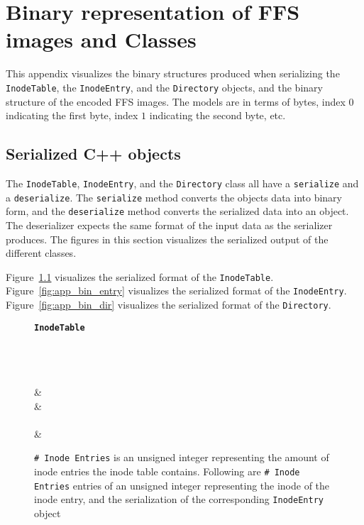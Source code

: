 \renewcommand{\chaptermark}[1]{\markboth{Appendix \thechapter\relax:\thinspace\relax#1}{}}
\chapter{Binary representation of FFS images and Classes}
\label{app:binary_rep}
This appendix visualizes the binary structures produced when serializing the \texttt{InodeTable}, the \texttt{InodeEntry}, and the \texttt{Directory} objects, and the binary structure of the encoded FFS images. The models are in terms of bytes, index $0$ indicating the first byte, index $1$ indicating the second byte, etc.

\section{Serialized C++ objects}
The \texttt{InodeTable}, \texttt{InodeEntry}, and the \texttt{Directory} class all have a \texttt{serialize} and a \texttt{deserialize}. The \texttt{serialize} method converts the objects data into binary form, and the \texttt{deserialize} method converts the serialized data into an object. The deserializer expects the same format of the input data as the serializer produces. The figures in this section visualizes the serialized output of the different classes. 

Figure~\ref{fig:app_bin_table} visualizes the serialized format of the \texttt{InodeTable}. Figure~\ref{fig:app_bin_entry} visualizes the serialized format of the \texttt{InodeEntry}. Figure~\ref{fig:app_bin_dir} visualizes the serialized format of the \texttt{Directory}. 
	
\begin{figure}[!htb]
	\label{fig:app_bin_table}
	\centering
    \textbf{\texttt{InodeTable}}\par\medskip

	\begin{bytefield}[bitwidth=0.0625\textwidth]{16}
		 \\
		\\
		 \\
		 &  \\
		 &  \\
		 \\[1ex]
		 &  \\
	\end{bytefield}
	\caption[Byte representation of the serialization of a \texttt{InodeTable} object]{\texttt{\#~Inode Entries} is an unsigned integer representing the amount of inode entries the inode table contains. Following are \texttt{\#~Inode Entries} entries of an unsigned integer representing the inode of the inode entry, and the serialization of the corresponding \texttt{InodeEntry} object}
\end{figure}

